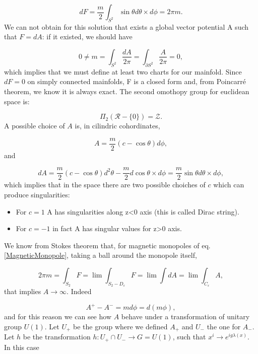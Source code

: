 \documentclass[main.tex]{subfiles}
\begin{document}
\begin{equation}
dF=\frac{m}{2}\int_{S^2}\sin\theta d\theta\times d\phi=2\pi m.
\end{equation}
We can not obtain for this solution that exists a global vector potential A such that $F=dA$: if it existed, we should have

\begin{equation}
0\neq m=\int_{S^2}\frac{dA}{2\pi}=\int_{\partial S^2}\frac{A}{2\pi}=0,
\end{equation}
which implies that we must define at least two charts for our mainfold.
Since $dF=0$ on simply connected mainfolds, F is a closed form and, from Poincarré theorem, we know it is always exact. The second omothopy group for euclidean space is:

\begin{equation}
\Pi_2\left(\mathcal{R}-\bigl\{0\bigr\}\right)=\mathcal{Z}.
\end{equation}
A possible choice of $A$ is, in cilindric cohordinates,

\begin{equation}
A=\frac{m}{2}\left(c-\cos\theta\right)d\phi,
\end{equation}
and

\begin{equation}
dA=\frac{m}{2}\left(c-\cos\theta\right)d^2\theta-\frac{m}{2}d\cos\theta\times d \phi=\frac{m}{2}\sin\theta d\theta\times d \phi,
\end{equation}
which implies that in the space there are two possible choiches of $c$ which can produce singularities:

\begin{itemize}
\item For $c=1$ A has singularities along z<0 axis (this is called Dirac string).
\item For $c=-1$ in fact A has singular values for z>0 axis.
\end{itemize}
We know from Stokes theorem that, for magnetic monopoles of eq. \eqref{MagneticMonopole}, taking a ball around the monopole itself,

\begin{equation}\label{MagCharge}
2\pi m=\int_{S_2} F=\lim\int_{S_2-D_{\varepsilon}}F=\lim\int dA=\lim\int_{C_{\varepsilon}} A,
\end{equation}
that implies $A\to\infty$. Indeed

\begin{equation}
A^+-A^-=md\phi=d(m\phi),
\end{equation}
and for this reason we can see how $A$ behave under a transformation of unitary group $U(1)$. Let $U_+$ be the group where we defined $A_+$ and $U_-$ the one for $A_-$.
Let $h$ be the transformation $h:U_+\cap U_- \to G=U(1)$, such that $x^i\to e^{ig\lambda(x)}$. In this case
\end{document}
